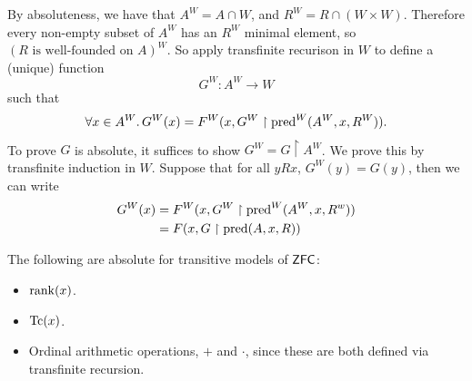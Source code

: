 \documentclass{article}
\begin{document}
\proof By absoluteness, we have that $A^{W} = A \cap W$, and $R^{W} = R \cap (W \times W)$. Therefore every non-empty subset of $A^{W}$ has an $R^{W}$ minimal element, so $(R \text{ is well-founded on } A)^{W}$.\gap
So apply transfinite recurison in $W$ to define a (unique) function \[G^{W} : A^{W} \to W\] such that \[ \forall x \in A^{W}. \, G^{W}(x) = F^{W}(x, G^{W} \upharpoonright \operatorname{pred}^{W}(A^{W},x,R^{W})).\]
To prove $G$ is absolute, it suffices to show $G^{W} = G \upharpoonright A^{W}$. We prove this by transfinite induction in $W$. Suppose that for all $yRx$, $G^{W}(y) = G(y)$, then we can write \begin{align*}G^{W}(x) & = F^{W}(x,G^{W} \upharpoonright \operatorname{pred}^{W}(A^{W},x,R^{w})) \\
                       & = F(x, G \upharpoonright \operatorname{pred}(A,x,R))
\end{align*}
\endproof
\begin{corr}{}
    The following are absolute for transitive models of $\mathsf{ZFC}$: \begin{itemize}
        \item $\rank(x)$.
        \item $\operatorname{Tc}(x)$.
        \item Ordinal arithmetic operations, $+$ and $\cdot$, since these are both defined via transfinite recursion.
    \end{itemize}
\end{corr}
\end{document}

